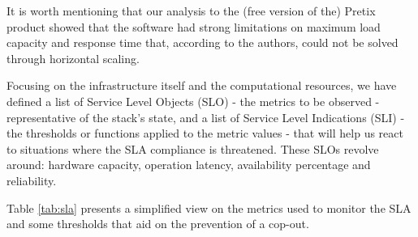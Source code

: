 \documentclass[12pt]{article}
\begin{document}
It is worth mentioning that our analysis to the (free version of the) Pretix product showed that the software had strong limitations on maximum load capacity
and response time that, according to the authors, could not be solved through horizontal scaling.

Focusing on the infrastructure itself and the computational resources, we have defined a list of Service Level Objects (SLO) - the metrics to be observed -
representative of the stack's state, and a list of Service Level Indications (SLI) - the thresholds or functions applied to the metric values - that will
help us react to situations where the SLA compliance is threatened.
These SLOs revolve around: hardware capacity, operation latency, availability percentage and reliability.

Table \ref{tab:sla} presents a simplified view on the metrics used to monitor the SLA and some thresholds that aid on the prevention of a cop-out.
\end{document}
